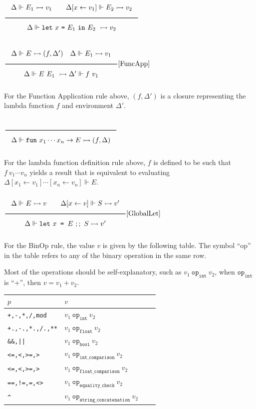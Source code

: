 \documentclass[a4paper]{article}
\newcommand{\Rule}[2]{\genfrac{}{}{0.7pt}{}{{\setlength{\fboxrule}{0pt}\setlength{\fboxsep}{3mm}\fbox{$#1$}}}{{\setlength{\fboxrule}{0pt}\setlength{\fboxsep}{3mm}\fbox{$#2$}}}}
\newcommand{\RuleWithName}[3]{\genfrac{}{}{0.7pt}{}{{\setlength{\fboxrule}{0pt}\setlength{\fboxsep}{3mm}\fbox{$#1$}}}{{\setlength{\fboxrule}{0pt}\setlength{\fboxsep}{3mm}\fbox{$#2$}}}[\text{#3}]}
\newcommand{\Int}{\texttt{int}}
\newcommand{\Float}{\texttt{float}}
\newcommand{\Bool}{\texttt{bool}}
\newcommand{\eval}{\rightarrowtail}
\newcommand{\under}{\Vdash}
\begin{document}
$\Rule{\Delta \under E_1 \eval v_1 \qquad \Delta[x \leftarrow v_1] \under E_2 \eval v_2}{\Delta \under \texttt{let}\ x\ \texttt{=}\ E_1\ \texttt{in}\ E_2\ \eval v_2}$

$\RuleWithName{\Delta \under E \eval (f, \Delta') \quad \Delta \under E_1 \eval v_1}
{\Delta \under E\ E_1\ \eval \Delta' \under f\ v_1}{FuncApp}$

For the Function Application rule above, $(f, \Delta')$ is a closure representing the lambda function $f$ and environment $\Delta'$.

$\Rule{}{\Delta \under \texttt{fun}\ x_1 \cdots x_n \rightarrow E \eval (f, \Delta)}$

For the lambda function definition rule above, $f$ is defined to be such that $f\ v_1 \cdots v_n$ yields a result that is
equivalent to evaluating $\Delta[x_1 \leftarrow v_1] \cdots [x_n \leftarrow v_n] \under E$.

$\RuleWithName{\Delta \under E \eval v \qquad \Delta[x \leftarrow v] \under S \eval v'}
{\Delta \under \texttt{let}\ x \texttt{ = } E\ ;;\ S \eval v'}{GlobalLet}$

For the BinOp rule, the value $v$ is given by the following table.
The symbol ``op'' in the table refers to any of the binary operation in the same row.

Most of the operations should be self-explanatory, such as $v_1\ \texttt{op}_{\Int}\ v_2$, when $\texttt{op}_{\Int}$ is ``+'', then $v = v_1 + v_2$.

\begin{tabular}{|l||l|l|l|} \hline
$p$ & $v$ \\ \hline \hline
\verb#+,-,*,/,mod# & $v_1\ \texttt{op}_{\Int}\ v_2$ \\ \hline
\verb#+.,-.,*.,/.,**# & $v_1\ \texttt{op}_{\Float}\ v_2$ \\ \hline
\verb#&&,||#  & $v_1\ \texttt{op}_{\Bool}\ v_2$ \\ \hline
\verb#<=,<,>=,># & $v_1\ \texttt{op}_{\Int \_ \texttt{comparison}}\ v_2$ \\ \hline
\verb#<=,<,>=,># & $v_1\ \texttt{op}_{\Float \_ \texttt{comparison}}\ v_2$  \\ \hline
\verb#==,!=,=,<># & $v_1\ \texttt{op}_{\texttt{equality\_check}}\ v_2$ \\ \hline
\verb#^# & $v_1\ \texttt{op}_{\texttt{string\_concatenation}}\ v_2$ \\ \hline
\end{tabular}
\vspace{3mm}
\end{document}
